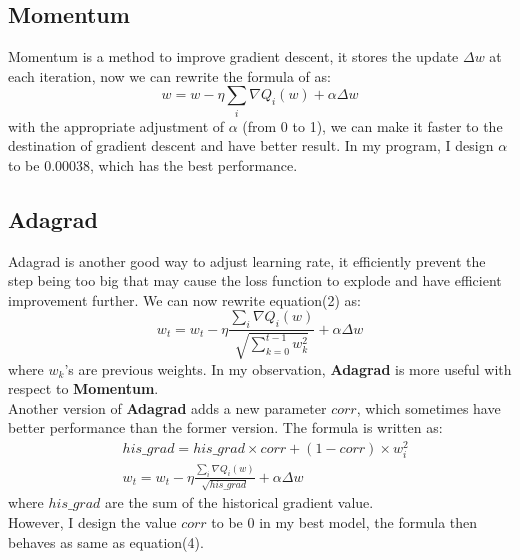 \documentclass[11pt]{article}
\newcommand\n{\mbox{\qquad}}
\begin{document}
\subsection{Momentum}
\n Momentum is a method to improve gradient descent, it stores the update $\Delta w$ at each iteration, now we can rewrite the formula of as:
	\begin{equation}
		w = w - \eta \sum_i \nabla Q_i(w) + \alpha \Delta w
	\end{equation}
with the appropriate adjustment of $\alpha$ (from 0 to 1), we can make it faster to the destination of gradient descent and have better result. In my program, I design $\alpha$ to be 0.00038, which has the best performance. 
\subsection{Adagrad}
\n Adagrad is another good way to adjust learning rate, it efficiently prevent the step being too big that may cause the loss function to explode and have efficient improvement further. We can now rewrite equation(2) as:
	\begin{equation}
		w_t = w_t - \eta \frac{\sum_i \nabla Q_i(w)}{\sqrt{\sum_{k=0}^{t-1} w_k^2}} + \alpha \Delta w
	\end{equation}
where $w_k$'s are previous weights. In my observation, \textbf{Adagrad} is more useful with respect to \textbf{Momentum}. \\
\n Another version of \textbf{Adagrad} adds a new parameter $corr$, which sometimes have better performance than the former version. The formula is written as:
\begin{align*}
	&his\_grad = his\_grad \times corr + (1-corr) \times w_i^2 \\
 	&w_t = w_t - \eta \frac{\sum_i \nabla Q_i(w)}{\sqrt{his\_grad}} + \alpha \Delta w
\end{align*}
where $his\_grad$ are the sum of the historical gradient value.\\
\n However, I design the value $corr$ to be 0 in my best model, the formula then behaves as same as equation(4).
\end{document}
